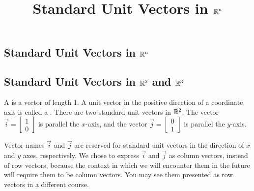 \documentclass{ximera}
\title{Standard Unit Vectors in $\mathbb{R}^n$} \license{CC BY-NC-SA 4.0}
\begin{document}
\begin{abstract}
  
\end{abstract}
\maketitle

\begin{onlineOnly}
\section*{Standard Unit Vectors in $\mathbb{R}^n$}
\end{onlineOnly}

\subsection*{Standard Unit Vectors in $\mathbb{R}^2$ and $\mathbb{R}^3$} 
A  is a vector of length 1.  A unit vector in the positive direction of a coordinate axis is called a .  There are two standard unit vectors in $\mathbb{R}^2$.  The vector $\vec{i}=\begin{bmatrix}
1\\
0
\end{bmatrix}$ is parallel the $x$-axis, and the vector $\vec{j}=\begin{bmatrix}
0\\
1
\end{bmatrix}$ is parallel the $y$-axis.  

\begin{center}
\end{center}

Vector names $\vec{i}$ and $\vec{j}$ are reserved for standard unit vectors in the direction of $x$ and $y$ axes, respectively.  We chose to express $\vec{i}$ and $\vec{j}$ as column vectors, instead of row vectors, because the context in which we will encounter them in the future will require them to be column vectors.  You may see them presented as row vectors in a different course.
\end{document}
